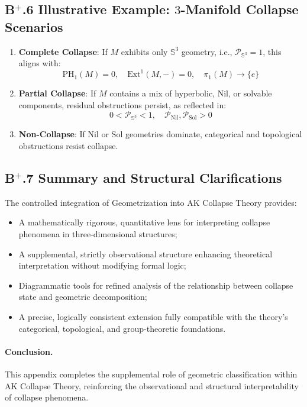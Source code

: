 \documentclass[11pt]{article}
\begin{document}
\subsection*{B$^{+}$.6 Illustrative Example: $3$-Manifold Collapse Scenarios}

\begin{enumerate}
    \item \textbf{Complete Collapse}: If $M$ exhibits only $\mathbb{S}^3$ geometry, i.e., $\mathcal{P}_{\mathbb{S}^3} = 1$, this aligns with:
    \[
    \mathrm{PH}_1(M) = 0,\quad \mathrm{Ext}^1(M, -) = 0,\quad \pi_1(M) \longrightarrow \{e\}
    \]
    \item \textbf{Partial Collapse}: If $M$ contains a mix of hyperbolic, Nil, or solvable components, residual obstructions persist, as reflected in:
    \[
    0 < \mathcal{P}_{\mathbb{S}^3} < 1,\quad \mathcal{P}_{\mathrm{Nil}},\mathcal{P}_{\mathrm{Sol}} > 0
    \]
    \item \textbf{Non-Collapse}: If $\mathrm{Nil}$ or $\mathrm{Sol}$ geometries dominate, categorical and topological obstructions resist collapse.
\end{enumerate}

\subsection*{B$^{+}$.7 Summary and Structural Clarifications}

The controlled integration of Geometrization into AK Collapse Theory provides:

\begin{itemize}
    \item A mathematically rigorous, quantitative lens for interpreting collapse phenomena in three-dimensional structures;
    \item A supplemental, strictly observational structure enhancing theoretical interpretation without modifying formal logic;
    \item Diagrammatic tools for refined analysis of the relationship between collapse state and geometric decomposition;
    \item A precise, logically consistent extension fully compatible with the theory's categorical, topological, and group-theoretic foundations.
\end{itemize}

\paragraph{Conclusion.} This appendix completes the supplemental role of geometric classification within AK Collapse Theory, reinforcing the observational and structural interpretability of collapse phenomena.
\end{document}
